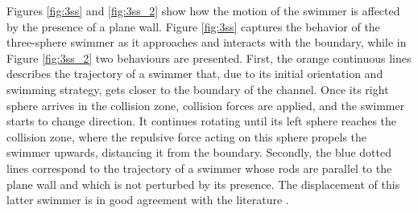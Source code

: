 \documentclass[graybox]{svmult}
\begin{document}
Figures \ref{fig:3ss} and \ref{fig:3ss_2} show how the motion of the swimmer is affected by the presence of a plane wall. Figure \ref{fig:3ss} captures the behavior of the three-sphere swimmer as it approaches and interacts with the boundary, while in Figure \ref{fig:3ss_2} two behaviours are presented. First, the orange continuous lines describes the trajectory of a swimmer that, due to its initial orientation and swimming strategy, gets closer to the boundary of the channel. Once its right sphere arrives in the collision zone, collision forces are applied, and the swimmer starts to change direction. It continues rotating until its left sphere reaches the collision zone, where the repulsive force acting on this sphere propels the swimmer upwards, distancing it from the boundary. 
Secondly, the blue dotted lines correspond to the trajectory of a swimmer whose rods are parallel to the plane wall and which is not perturbed by its presence. The displacement of this latter swimmer is in good agreement with the literature \cite{najafi_simplest_2004}.
\end{document}
